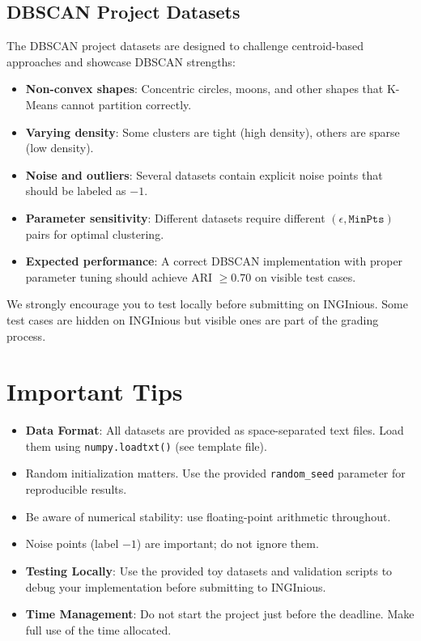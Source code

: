 \documentclass[]{article}
\begin{document}
	\subsection{DBSCAN Project Datasets}
	
	The DBSCAN project datasets are designed to challenge centroid-based approaches and showcase DBSCAN strengths:
	
	\begin{itemize}
		\item \textbf{Non-convex shapes}: Concentric circles, moons, and other shapes that K-Means cannot partition correctly.
		\item \textbf{Varying density}: Some clusters are tight (high density), others are sparse (low density).
		\item \textbf{Noise and outliers}: Several datasets contain explicit noise points that should be labeled as $-1$.
		\item \textbf{Parameter sensitivity}: Different datasets require different $(\epsilon, \texttt{MinPts})$ pairs for optimal clustering.
		\item \textbf{Expected performance}: A correct DBSCAN implementation with proper parameter tuning should achieve ARI $\geq 0.70$ on visible test cases.
	\end{itemize}
	
	We strongly encourage you to test locally before submitting on INGInious. Some test cases are hidden on INGInious but visible ones are part of the grading process.
	
	\section{Important Tips}
	
	\begin{itemize}
		\item \textbf{Data Format}: All datasets are provided as space-separated text files. Load them using \texttt{numpy.loadtxt()} (see template file).
		\item Random initialization matters. Use the provided \texttt{random\_seed} parameter for reproducible results.
		\item Be aware of numerical stability: use floating-point arithmetic throughout.
		\item Noise points (label $-1$) are important; do not ignore them.
		\item \textbf{Testing Locally}: Use the provided toy datasets and validation scripts to debug your implementation before submitting to INGInious.
		\item \textbf{Time Management}: Do not start the project just before the deadline. Make full use of the time allocated.
	\end{itemize}
	

	
\end{document}
